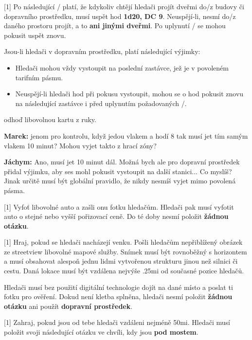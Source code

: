 \begin{cards}
	 Po následující \timecursedoorduration/ platí, že kdykoliv chtějí hledači projít dveřmi do/z budovy či dopravního prostředku, musí uspět hod \textbf{1d20, DC 9}. Neuspějí-li, nesmí do/z daného prostoru projít, a to \textbf{ani jinými dveřmi}. Po uplynutí \timecursedoorreattempt/ se mohou pokusit uspět znovu.

	Jsou-li hledači v dopravním prostředku, platí následující výjimky:
	\begin{itemize}
		\item Hledači mohou vždy vystoupit na poslední zastávce, jež je v povoleném tarifním pásmu.
		\item Neuspějí-li hledači hod při pokusu vystoupit, mohou se o hod pokusit znovu na následující zastávce i před uplynutím požadovaných \timecursedoorreattempt/.
	\end{itemize}

	\cost odhoď libovolnou kartu z ruky.

	\begin{reasoning}
		\textbf{Marek:} jenom pro kontrolu, když jedou vlakem a hodí 8 tak musí jet tím samým vlakem 10 minut? Mohou vyjet takto z hrací zóny?

		\textbf{Jáchym:} Ano, musí jet 10 minut dál. Možná bych ale pro dopravní prostředek přidal výjimku, aby ses mohl pokusit vystoupit na další stanici... Co myslíš? Jinak určitě musí být globální pravidlo, že nikdy nesmíš vyjet mimo povolená pásma.
	\end{reasoning}

	 Vyfoť libovolné auto a zašli onu fotku hledačům. Hledači pak musí vyfotit auto o stejné nebo vyšší pořizovací ceně. Do té doby nesmí položit \textbf{žádnou otázku}.

	 Hraj, pokud se hledači nacházejí venku. Pošli hledačům nepřiblížený obrázek ze streetview libovolné mapové služby. Snímek musí být rovnoběžný s horizontem a musí obsahovat alespoň jednu lidmi vytvořenou strukturu jinou než silnici či cestu. Daná lokace musí být vzdálena nejvýše \dist.25mi od současné pozice hledačů.

	Hledači musí bez použití digitální technologie dojít na dané místo a poslat ti fotku pro ověření. Dokud není kletba splněna, hledači nesmí položit \textbf{žádnou otázku} ani použít \textbf{dopravní prostředek}.

	 Zahraj, pokud jsou od tebe hledači vzdáleni nejméně \dist50mi. Hledači musí položit svoji následující otázku ve chvíli, kdy jsou \textbf{pod mostem}.


\end{cards}
